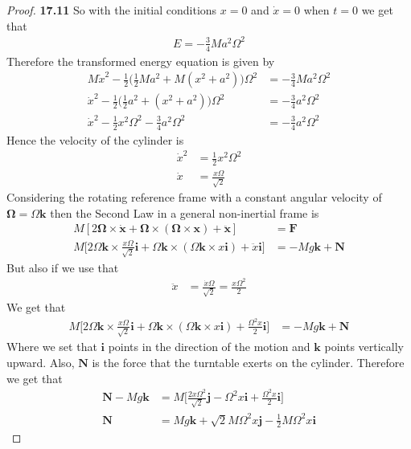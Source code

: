 \documentclass[11pt]{article}
\newcommand{\uvi}{\bm{i}}
\newcommand{\uvj}{\bm{j}}
\newcommand{\uvk}{\bm{k}}
\theoremstyle{definition}
\begin{document}
\begin{proof}{\textbf{17.11}}
    So with the initial conditions $x = 0$ and $\dot x = 0$ when $t=0$ we get
    that
    \begin{align*}
        E = - \frac{3}{4}Ma^2\Omega^2
    \end{align*}
    Therefore the transformed energy equation is given by
    \begin{align*}
        M\dot x^2
        - \frac{1}{2}\bigg(\frac{1}{2}Ma^2 + M(x^2 + a^2)\bigg)\Omega^2
        &= - \frac{3}{4}Ma^2\Omega^2\\
        \dot x^2
        - \frac{1}{2}\bigg(\frac{1}{2}a^2 + (x^2 + a^2)\bigg)\Omega^2
        &= - \frac{3}{4}a^2\Omega^2\\
        \dot x^2 - \frac{1}{2}x^2\Omega^2 - \frac{3}{4}a^2\Omega^2
        &= - \frac{3}{4}a^2\Omega^2
    \end{align*}
    Hence the velocity of the cylinder is 
    \begin{align*}
        \dot x^2&= \frac{1}{2}x^2\Omega^2\\
        \dot x&= \frac{x\Omega}{\sqrt{2}}
    \end{align*}
    Considering the rotating reference frame with a constant angular velocity
    of $\bm\Omega = \Omega \bm{k}$ then the Second Law in a general
    non-inertial frame is 
    \begin{align*}
        M[
            2\bm\Omega\times\bm{\dot x}
            + \bm{\Omega}\times(\bm{\Omega}\times \bm{x}) + \bm{\ddot{x}}
        ] &= \bm{F}\\
        M\bigg[
            2\Omega\uvk \times \frac{x\Omega}{\sqrt{2}}\uvi
            + \Omega\uvk \times (\Omega\uvk \times x\bm{i})
            + \ddot x\uvi
        \bigg] &= -Mg\uvk + \bm{N}
    \end{align*}
    But also if we use that
    \begin{align*}
        \ddot x&= \frac{\dot x\Omega}{\sqrt{2}}
        = \frac{x\Omega^2}{2}
    \end{align*}
    We get that
    \begin{align*}
        M\bigg[
            2\Omega\uvk \times \frac{x\Omega}{\sqrt{2}}\uvi
            + \Omega\uvk \times (\Omega\uvk \times x\bm{i})
            + \frac{\Omega^2 x}{2}\uvi
        \bigg] &= -Mg\uvk + \bm{N}
    \end{align*}
    Where we set that $\uvi$ points in the direction of the motion and
    $\uvk$ points vertically upward. Also, $\bm{N}$ is the force that
    the turntable exerts on the cylinder. Therefore we get that
    \begin{align*}
        \bm{N} -Mg\uvk &= M\bigg[
            \frac{2x\Omega^2}{\sqrt{2}}\uvj
            -\Omega^2 x \uvi
            + \frac{\Omega^2 x}{2}\uvi
        \bigg]\\
        \bm{N} &= Mg\uvk + \sqrt{2}M\Omega^2x\uvj - \frac{1}{2}M\Omega^2 x\uvi
    \end{align*}
\end{proof}
\end{document}
